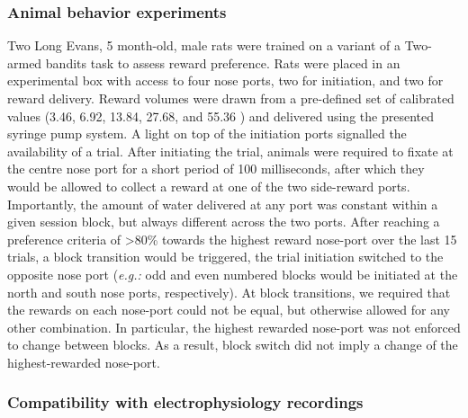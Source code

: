 \subsubsection*{Animal behavior experiments}
Two Long Evans, 5 month-old, male rats were trained on a variant of a Two-armed bandits task  to assess reward preference. Rats were placed in an experimental box with access to four nose ports, two for initiation, and two for reward delivery. Reward volumes were drawn from a pre-defined set of calibrated values (3.46, 6.92, 13.84, 27.68, and 55.36 ) and delivered using the presented syringe pump system. A light on top of the initiation ports signalled the availability of a trial. After initiating the trial, animals were required to fixate at the centre nose port for a short period of 100 milliseconds, after which they would be allowed to collect a reward at one of the two side-reward ports. Importantly, the amount of water delivered at any port was constant within a given session block, but always different across the two ports. After reaching a preference criteria of >80\% towards the highest reward nose-port over the last 15 trials, a block transition would be triggered, the trial initiation switched to the opposite nose port (\textit{e.g.:} odd and even numbered blocks would be initiated at the north and south nose ports, respectively). At block transitions, we required that the rewards on each nose-port could not be equal, but otherwise allowed for any other combination. In particular, the highest rewarded nose-port was not enforced to change between blocks. As a result, block switch did not imply a change of the highest-rewarded nose-port.


\subsubsection*{Compatibility with electrophysiology recordings}


